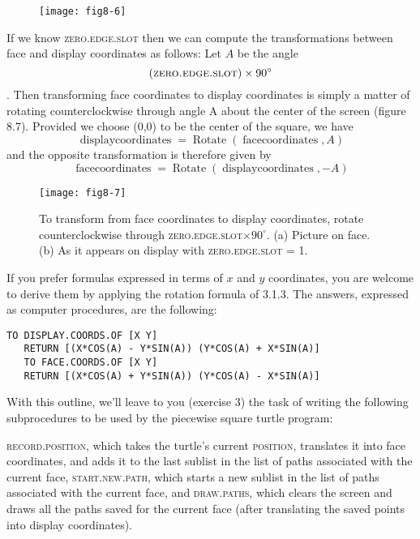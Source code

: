 \documentclass{book}
\begin{document}
\begin{figure}
\begin{center}
\texttt{[image: fig8-6]}
\caption{}
\end{center}
\end{figure}

If we know \textsc{zero}\textsc{.edge}\textsc{.slot} then we can compute the transformations
between face and display coordinates as follows: Let $A$ be the angle
$$(\text{\textsc{zero}\textsc{.edge}\textsc{.slot}}) \times 90^{\circ}$$. Then transforming face coordinates to display
coordinates is simply a matter of rotating counterclockwise through
angle A about the center of the screen (figure 8.7). Provided we choose
(0,0) to be the center of the square, we have
$$\operatorname{display coordinates} = \operatorname{Rotate}(\operatorname{face coordinates}, A)$$
 and the opposite transformation is therefore given by
$$\operatorname{face coordinates} = \operatorname{Rotate}(\operatorname{display coordinates}, -A)$$

\begin{figure}
\begin{center}
\texttt{[image: fig8-7]}
\caption{To transform from face coordinates to display coordinates, rotate counterclockwise through \textsc{zero}\textsc{.edge}\textsc{.slot}$\times 90^{\circ}$. (a) Picture on face. (b) As it appears on display with \textsc{zero}\textsc{.edge}\textsc{.slot} = 1.}
\end{center}
\end{figure}

If you prefer formulas expressed in terms of $x$ and $y$ coordinates, you
are welcome to derive them by applying the rotation formula of 3.1.3.
The answers, expressed as computer procedures, are the following:

\begin{verbatim}
TO DISPLAY.COORDS.OF [X Y]
   RETURN [(X*COS(A) - Y*SIN(A)) (Y*COS(A) + X*SIN(A)]
   TO FACE.COORDS.OF [X Y]
   RETURN [(X*COS(A) + Y*SIN(A)) (Y*COS(A) - X*SIN(A)]
\end{verbatim}
With this outline, we'll leave to you (exercise 3) the task of writing
the following subprocedures to be used by the piecewise square turtle
program:

\textsc{record}\textsc{.position}, which takes the turtle's current \textsc{position}, translates it into face coordinates, and adds it to the last sublist in the list of
paths associated with the current face, \textsc{start}\textsc{.new}\textsc{.path}, which starts a new sublist in the list of paths associated with the current face, and \textsc{draw}\textsc{.paths}, which clears the screen and draws all the paths saved
for the current face (after translating the saved points into display coordinates).
\end{document}
